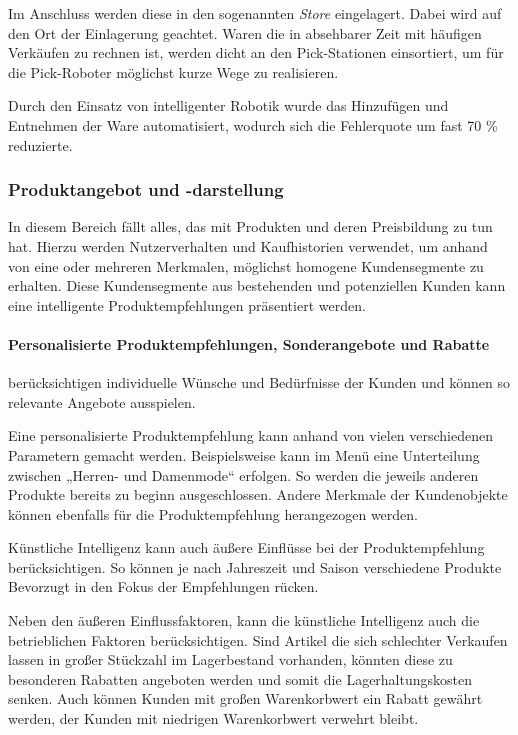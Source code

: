 Im Anschluss werden diese in den sogenannten \textit{Store} eingelagert. Dabei wird auf den Ort der Einlagerung geachtet. Waren die in absehbarer Zeit mit häufigen Verkäufen zu rechnen ist, werden dicht an den Pick-Stationen einsortiert, um für die Pick-Roboter möglichst kurze Wege zu realisieren.\vspace{0.2cm}



Durch den Einsatz von intelligenter Robotik wurde das Hinzufügen und Entnehmen der Ware automatisiert, wodurch sich die Fehlerquote um fast 70 \% reduzierte.

\subsubsection{Produktangebot und -darstellung}
In diesem Bereich fällt alles, das mit Produkten und deren Preisbildung zu tun hat. Hierzu werden Nutzerverhalten und Kaufhistorien verwendet, um anhand von eine oder mehreren Merkmalen, möglichst homogene Kundensegmente zu erhalten. Diese Kundensegmente aus bestehenden und potenziellen Kunden kann eine intelligente Produktempfehlungen präsentiert werden.

\paragraph{Personalisierte Produktempfehlungen, Sonderangebote und Rabatte} berücksichtigen individuelle Wünsche und Bedürfnisse der Kunden und können so relevante Angebote ausspielen.\vspace{0.2cm}

Eine personalisierte Produktempfehlung kann anhand von vielen verschiedenen Parametern gemacht werden. Beispielsweise kann im Menü eine Unterteilung zwischen „Herren- und Damenmode“ erfolgen. So werden die jeweils anderen Produkte bereits zu beginn ausgeschlossen. Andere Merkmale der Kundenobjekte können ebenfalls für die Produktempfehlung herangezogen werden.\vspace{0.2cm}

Künstliche Intelligenz kann auch äußere Einflüsse bei der Produktempfehlung berücksichtigen. So können je nach Jahreszeit und Saison verschiedene Produkte Bevorzugt in den Fokus der Empfehlungen rücken.\vspace{0.2cm}

Neben den äußeren Einflussfaktoren, kann die künstliche Intelligenz auch die betrieblichen Faktoren berücksichtigen. Sind Artikel die sich schlechter Verkaufen lassen in großer Stückzahl im  Lagerbestand vorhanden, könnten diese zu besonderen Rabatten angeboten werden und somit die Lagerhaltungskosten senken. Auch können Kunden mit großen Warenkorbwert ein Rabatt gewährt werden, der Kunden mit niedrigen Warenkorbwert verwehrt bleibt.\vspace{0.2cm}

